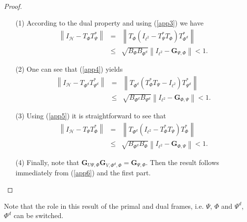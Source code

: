 \documentclass{birkjour}
\theoremstyle{definition}
\theoremstyle{remark}
\numberwithin{equation}{section}
\begin{document}
\begin{proof}

\begin{enumerate}
\item[(1)]  According to the dual property and using (\ref{app3}) we have
\begin{eqnarray*}
\left\|I_{\mathcal{H}}-T_{\Phi}T_{\Psi}^*\right\|&=&\left\|T_{\Phi}\left(I_{\ell^2}-T_{\Psi}^*T_{\Phi}\right)T_{\Phi^d}^*\right\|\\
&\leq&\sqrt{
B_{\Phi}B_{\Phi^d}}\left\|I_{\ell^2}-\mathbf{G}_{\Psi,\Phi}\right\|<1.
\end{eqnarray*}
\item[(2)]  One can see that (\ref{app4}) yields
\begin{eqnarray*}
\left\|I_{\mathcal{H}}-T_{\Phi^d}T_{\Psi^d}^*\right\|&=&\left\|T_{\Phi^d}\left(T_{\Phi}^*T_{\Psi}-I_{\ell^2}\right)T_{\Psi^d}^*\right\|\\
&\leq&\sqrt{
B_{\Phi^d}B_{\Psi^d}}\left\|I_{\ell^2}-\mathbf{G}_{\Phi,\Psi}\right\|<1.
\end{eqnarray*}
\item[(3)] Using (\ref{app5}) it is straightforward to see that
\begin{eqnarray*}
\left\|I_{\mathcal{H}}-T_{\Psi}T_{\Phi}^*\right\|&=&\left\|T_{\Phi^d}\left(I_{\ell^2}-T_{\Phi}^*T_{\Psi}\right)T_{\Phi}^*\right\|\\
&\leq&\sqrt{
B_{\Phi^d}B_{\Phi}}\left\|I_{\ell^2}-\mathbf{G}_{\Phi,\Psi}\right\|<1.
\end{eqnarray*}
\item[(4)] Finally, note that
$\mathbf{G}_{U\Psi,\Phi}\mathbf{G}_{V,\Phi^{d},\Phi}=\mathbf{G}_{\Psi,\Phi}$.
Then the result follows immediately from (\ref{app6}) and the first part. 

 \end{enumerate}
\end{proof}
Note that the role in this result of the primal and dual frames, i.e. $\Psi$, $\Phi$ and $\Psi^d$, $\Phi^d$ can be switched.
\end{document}
